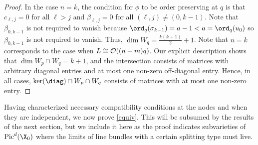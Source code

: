 \begin{proof}
In the case $n=k$, the condition for $\phi$ to be order preserving at $q$ is that $c_{\ell,j} = 0$ for all $\ell > j$  and $\beta_{\ell, j} = 0$ for all $(\ell, j) \neq (0, k-1)$. Note that $\beta_{0, k-1}$ is not required to vanish because $\ord_q(\sigma_{k-1}) = a-1 < a = \ord_q(u_0)$ so $\beta_{0, k-1}$ is not required to vanish. Thus, $\dim W_q =\frac{k(k+1)}{2}+1$. Note that $n = k$ corresponds to the case when $L \cong \mathcal{O}((n+m)q)$.
Our explicit description shows that $\dim W_p \cap W_q = k+1$, and the intersection consists of matrices with arbitrary diagonal entries and at most one non-zero off-diagonal entry. Hence, in all cases, $\ker(\diag) \cap W_p \cap W_q$ consists of matrices with at most one non-zero entry.
   \end{proof}

Having characterized necessary compatibility conditions at the nodes and when they are independent,
we now prove \eqref{equiv}. This will be subsumed by the results of the next section, but we include it here as the proof indicates subvarieties of $\Pic^d(\X_0)$ where the limits of line bundles with a certain splitting type must live.

